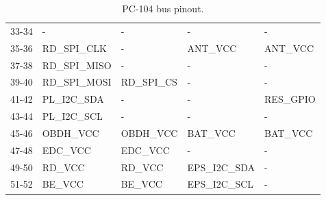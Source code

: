 \begin{table}[!h]
\begin{tabular}{cllll}
        33-34              & -                & -                & -               & -                \\
        35-36              & RD\_SPI\_CLK     & -                & ANT\_VCC        & ANT\_VCC         \\
        37-38              & RD\_SPI\_MISO    & -                & -               & -                \\
        39-40              & RD\_SPI\_MOSI    & RD\_SPI\_CS      & -               & -                \\
        41-42              & PL\_I2C\_SDA     & -                & -               & RES\_GPIO        \\
        43-44              & PL\_I2C\_SCL     & -                & -               & -                \\
        45-46              & OBDH\_VCC        & OBDH\_VCC        & BAT\_VCC        & BAT\_VCC         \\
        47-48              & EDC\_VCC         & EDC\_VCC         & -               & -                \\
        49-50              & RD\_VCC          & RD\_VCC          & EPS\_I2C\_SDA   & -                \\
        51-52              & BE\_VCC          & BE\_VCC          & EPS\_I2C\_SCL   & -                \\
        \bottomrule[1.5pt]
    \end{tabular}
    \caption{PC-104 bus pinout.}
    \label{tab:pc104-pinout}
\end{table}

